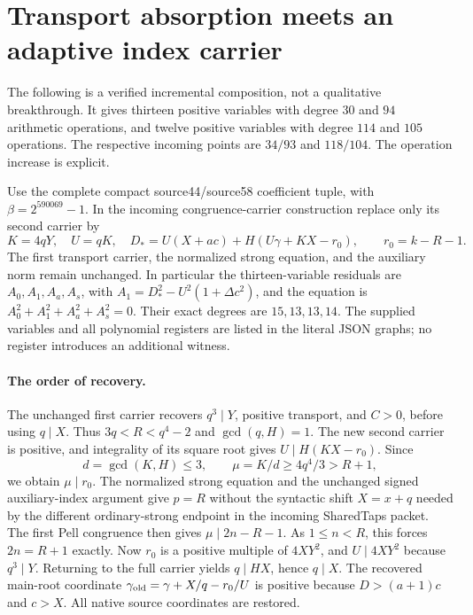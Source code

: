 \section{Transport absorption meets an adaptive index carrier}
The following is a verified incremental composition, not a qualitative
breakthrough.  It gives thirteen positive variables with degree $30$ and
$94$ arithmetic operations, and twelve positive variables with degree $114$
and $105$ operations.  The respective incoming points are $34/93$ and
$118/104$.  The operation increase is explicit.

Use the complete compact source44/source58 coefficient tuple, with
$\beta=2^{590069}-1$.  In the incoming congruence-carrier construction replace
only its second carrier by
\[
 K=4qY,\quad U=qK,\quad
 D_*=U(X+ac)+H(U\gamma+KX-r_0),\qquad r_0=k-R-1.
\]
The first transport carrier, the normalized strong equation, and the auxiliary
norm remain unchanged.  In particular the thirteen-variable residuals are
$A_0,A_1,A_a,A_s$, with $A_1=D_*^2-U^2(1+\Delta c^2)$, and the equation is
$A_0^2+A_1^2+A_a^2+A_s^2=0$.  Their exact degrees are $15,13,13,14$.
The supplied variables and all polynomial registers are listed in the literal
JSON graphs; no register introduces an additional witness.

\paragraph{The order of recovery.}
The unchanged first carrier recovers $q^3\mid Y$, positive transport, and
$C>0$, before using $q\mid X$.  Thus $3q<R<q^4-2$ and
$\gcd(q,H)=1$.  The new second carrier is positive, and integrality of its
square root gives $U\mid H(KX-r_0)$.  Since
\[
 d=\gcd(K,H)\le3,\qquad
 \mu=K/d\ge4q^4/3>R+1,
\]
we obtain $\mu\mid r_0$.  The normalized strong equation and the unchanged
signed auxiliary-index argument give $p=R$ without the syntactic shift
$X=x+q$ needed by the different ordinary-strong endpoint in the incoming
SharedTaps packet.  The first Pell congruence then gives
$\mu\mid2n-R-1$.  As $1\le n<R$, this forces $2n=R+1$ exactly.
Now $r_0$ is a positive multiple of $4XY^2$, and $U\mid4XY^2$ because
$q^3\mid Y$.  Returning to the full carrier yields $q\mid HX$, hence
$q\mid X$.  The recovered main-root coordinate
$\gamma_{\rm old}=\gamma+X/q-r_0/U$ is positive because
$D>(a+1)c$ and $c>X$.  All native source coordinates are restored.

